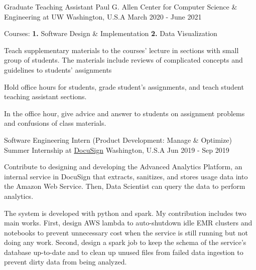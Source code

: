 \begin{cventries}
  \cventry
    {Graduate Teaching Assistant} %
    {Paul G. Allen Center for Computer Science \& Engineering at UW} %
    {Washington, U.S.A} %
    {March 2020 - June 2021} %
    {
      \begin{cvitems} %
        \item {
          Courses: \textbf{1.} Software Design \& Implementation \textbf{2.} Data Visualization
        }
        \item {
          Teach supplementary materials to the courses' lecture in sections with small group of students.
          The materials include reviews of complicated concepts and guidelines to students' assignments
        }
        \item {
          Hold office hours for students, grade student's assignments, and teach student teaching assistant sections.
        }
        \item {
          In the office hour, give advice and answer to students on assignment problems and confusions of class materials.
        }
      \end{cvitems}
    }

  \cventry
    {Software Engineering Intern (Product Development: Manage \& Optimize)} %
    {Summer Internship at \href{https://www.docusign.com/}{DocuSign}} %
    {Washington, U.S.A} %
    {Jun 2019 - Sep 2019} %
    {
      \begin{cvitems} %
        \item {
          Contribute to designing and developing the Advanced Analytics Platform, an internal service in DocuSign that extracts, sanitizes, and stores usage data into the Amazon Web Service.
          Then, Data Scientist can query the data to perform analytics.
        }
        \item {
          The system is developed with python and spark. My contribution includes two main works.
          First, design AWS lambda to auto-shutdown idle EMR clusters and notebooks to prevent unnecessary cost when the service is still running but not doing any work.
          Second, design a spark job to keep the schema of the service's database up-to-date and to clean up unused files from failed data ingestion to prevent dirty data from being analyzed.
        }
      \end{cvitems}
    }

\end{cventries}
